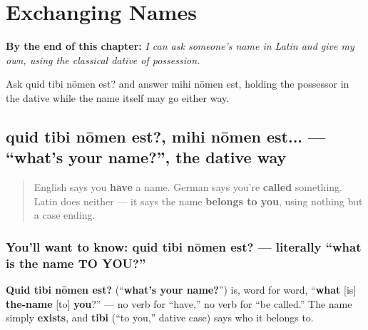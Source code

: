 
\chapter{Exchanging Names}
\label{ch:la-exchanging-names}

\begin{chapteropening}
\textbf{By the end of this chapter:} \emph{I can ask someone's name in Latin and give my own, using the classical dative of possession.}

Ask quid tibi nōmen est? and answer mihi nōmen est, holding the possessor in the dative while the name itself may go either way.
\end{chapteropening}

\section[quid tibi nōmen est? / mihi nōmen est...]{quid tibi nōmen est?, mihi nōmen est... — \textquotedblleft{}what's your name?\textquotedblright{}, the dative way}

\label{lesson:LA-C20-quid-tibi-nomen}



\begin{quote}
English says you \textbf{have} a name. German says you're \textbf{called} something. Latin does neither — it says the name \textbf{belongs to you}, using nothing but a case ending.
\end{quote}

\subsection*{You'll want to know: quid tibi nōmen est? — literally \textquotedblleft{}what is the name TO YOU?\textquotedblright{}}
\textbf{Quid tibi nōmen est?} (\textquotedblleft{}\textbf{what's your name?}\textquotedblright{}) is, word for word, \textquotedblleft{}\textbf{what} {[}is{]} \textbf{the-name} {[}to{]} \textbf{you}?\textquotedblright{} — no verb for \textquotedblleft{}have,\textquotedblright{} no verb for \textquotedblleft{}be called.\textquotedblright{} The name simply \textbf{exists}, and \textbf{tibi} (\textquotedblleft{}to you,\textquotedblright{} dative case) says who it belongs to.

